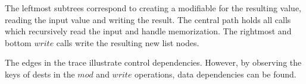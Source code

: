 The leftmost subtrees correspond to creating a modifiable for the resulting value, reading the input value and writing the result. The central path holds all calls which recursively read the input and handle memorization. The rightmost and bottom $write$ calls write the resulting new list nodes.  

The edges in the trace illustrate control dependencies. However, by observing the keys of dests in the $mod$ and $write$ operations, data dependencies can be found. 
